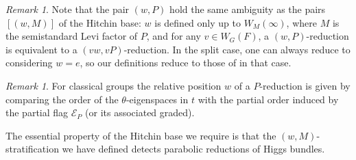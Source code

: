 \documentclass[openany]{amsbook}
\theoremstyle{definition}
\theoremstyle{remark}
\newtheorem{remark}[theorem]{Remark}
\numberwithin{equation}{section}
\newcommand{\cE}{\mathcal{E}}
\renewcommand{\-}{\operatorname{-}}
\begin{document}
\begin{remark}
    Note that the pair $(w, P)$ hold the same ambiguity as the pairs $[(w, M)]$ of the Hitchin base: $w$ is defined only up to $W_M(\infty)$, where $M$ is the semistandard Levi factor of $P$, and for any $v \in W_G(F)$, a $(w, P)$-reduction is equivalent to a $(vw, vP)$-reduction. In the split case, one can always reduce to considering $w = e$, so our definitions reduce to those of \cite{CLI} in that case.
\end{remark}

\begin{remark}
    For classical groups the relative position $w$ of a $P$-reduction is given by comparing the order of the $\theta$-eigenspaces in $t$ with the partial order induced by the partial flag $\cE_P$ (or its associated graded).
\end{remark}

The essential property of the Hitchin base we require is that the $(w,M)$-stratification we have defined detects parabolic reductions of Higgs bundles. 
\end{document}

